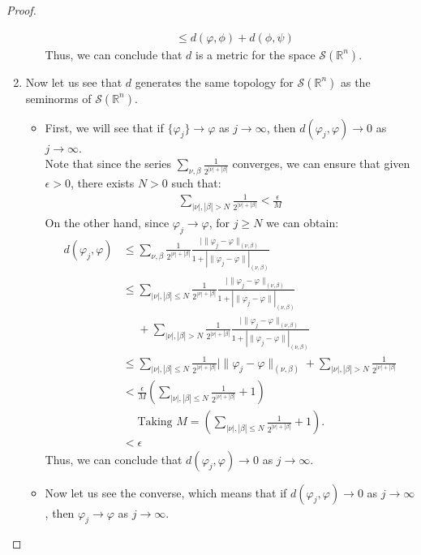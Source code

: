 \begin{proof}{}
\begin{enumerate}
\begin{itemize}
\begin{align*}
				    &\leq d(\varphi,\phi)+d(\phi,\psi)
			    \end{align*}
			    Thus, we can conclude that $d$ is a metric for the space $\mathcal{S}(\mathbb{R}^n)$.\\
		  \end{itemize}
		\item Now let us see that $d$ generates the same topology for $\mathcal{S}(\mathbb{R}^n)$ as the seminorms of $\mathcal{S}(\mathbb{R}^n)$.
		  \begin{itemize}
			  \item First, we will see that if $\{\varphi_j\}\rightarrow \varphi$ as $j\rightarrow \infty$, then $d(\varphi_j,\varphi)\rightarrow 0$ as $j\rightarrow \infty$.\\
			    Note that since the series $\sum_{\nu,\beta}\frac{1}{2^{|\nu|+|\beta|}}$ converges, we can ensure that given $\epsilon >0$, there exists $N>0$ such that:
			    \begin{align*}
				    \sum_{|\nu|,|\beta|> N}\frac{1}{2^{|\nu|+|\beta|}}<\frac{\epsilon}{M}
			    \end{align*}
			    On the other hand, since $\varphi_j\rightarrow \varphi$, for $j\geq N$ we can obtain:
			    \begin{align*}
            d(\varphi_j,\varphi)&\leq \sum_{\nu,\beta}\frac{1}{2^{|\nu|+|\beta|}}\frac{|\|\varphi_j-\varphi\|_{(\nu,\beta)}}{1+|\|\varphi_j-\varphi\||_{(\nu,\beta)}}\\
            &\leq \sum_{|\nu|,|\beta|\leq N}\frac{1}{2^{|\nu|+|\beta|}}\frac{|\|\varphi_j-\varphi\|_{(\nu,\beta)}}{1+|\|\varphi_j-\varphi\||_{(\nu,\beta)}}\\
            &\phantom{\leq}+ \sum_{|\nu|,|\beta|>N}\frac{1}{2^{|\nu|+|\beta|}}\frac{|\|\varphi_j-\varphi\|_{(\nu,\beta)}}{1+|\|\varphi_j-\varphi\||_{(\nu,\beta)}}\\
            &\leq \sum_{|\nu|,|\beta|\leq N}\frac{1}{2^{|\nu|+|\beta|}}|\|\varphi_j-\varphi\|_{(\nu,\beta)} + \sum_{|\nu|,|\beta|>N}\frac{1}{2^{|\nu|+|\beta|}}\\
            &<\frac{\epsilon}{M}\left(\sum_{|\nu|,|\beta|\leq N}\frac{1}{2^{|\nu|+|\beta|}}+1\right)\\
            &\phantom{<}\text{Taking $M=\left(\sum_{|\nu|,|\beta|\leq N}\frac{1}{2^{|\nu|+|\beta|}}+1\right)$.}\\
            &<\epsilon
			    \end{align*}
			    Thus, we can conclude that $d(\varphi_j,\varphi)\rightarrow 0$ as $j\rightarrow \infty$.
			  \item Now let us see the converse, which means that if $d(\varphi_j,\varphi)\rightarrow 0$ as $j\rightarrow \infty$, then $\varphi_j\rightarrow\varphi$ as $j\rightarrow \infty$.\\

\end{itemize}
\end{enumerate}
\end{proof}
